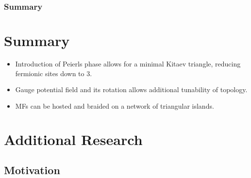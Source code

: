 \documentclass[xcolor=dvipsnames,10pt,aspectratio=169]{beamer}
\newcommand{\MO}{Motivation}
\newcommand{\CO}{Summary}
\begin{document}
  \begin{frame}
    \frametitle{Summary}

  \section{\CO}
    \begin{itemize}
      \item Introduction of Peierls phase allows for a minimal Kitaev triangle, reducing fermionic sites down to 3.
      \item Gauge potential field and its rotation allows additional tunability of topology.
      \item MFs can be hosted and braided on a network of triangular islands.
    \end{itemize}
  \end{frame}

  \section{Additional Research}

  \subsection{\MO}
\end{document}
